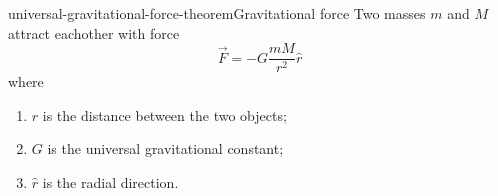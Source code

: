 \documentclass[preview]{standalone}
\begin{document}
\begin{snippettheorem}{universal-gravitational-force-theorem}{Gravitational force}
    Two masses \(m\) and \(M\) attract eachother with force
    \[
        \vec{F} = -G \frac{mM}{r^2} \hat{r}
    \]
    where
    \begin{enumerate}
        \item \(r\) is the distance between the two objects;
        \item \(G\) is the universal gravitational constant;
        \item \(\hat{r}\) is the radial direction.
    \end{enumerate}
\end{snippettheorem}

\end{document}
